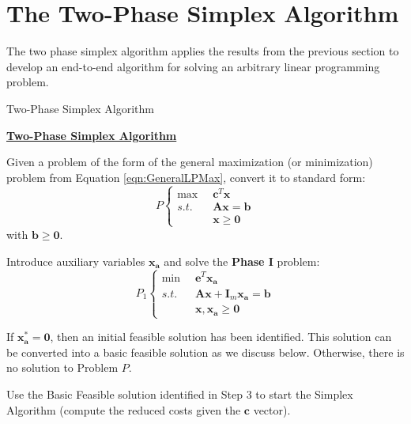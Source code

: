 \section{The Two-Phase Simplex Algorithm}
The two phase simplex algorithm applies the results from the previous section to develop an end-to-end algorithm for solving an arbitrary linear programming problem. 
\begin{algorithm}
\caption{Two-Phase Simplex Algorithm}
\label{alg:TwoPhaseSimplex}
\begin{center}
\begin{minipage}[t]{\textwidth-1em}
\underline{\textbf{Two-Phase Simplex Algorithm}}
\begin{enumerate*}
\item Given a problem of the form of the general maximization (or minimization) problem from Equation \ref{eqn:GeneralLPMax}, convert it to standard form:
\begin{displaymath}
P\left\{
\begin{aligned}
\max\;\; & \mathbf{c}^T\mathbf{x}\\
s.t.\;\; & \mathbf{A}\mathbf{x} = \mathbf{b}\\
& \mathbf{x} \geq \mathbf{0}
\end{aligned}\right.
\end{displaymath}
with $\mathbf{b} \geq \mathbf{0}$. 

\item Introduce auxiliary variables $\mathbf{x_a}$ and solve the \textbf{Phase I} problem:
\begin{displaymath}
P_1\left\{
\begin{aligned}
\min\;\; & \mathbf{e}^T\mathbf{x_a}\\
s.t.\;\; & \mathbf{A}\mathbf{x} + \mathbf{I}_m\mathbf{x_a} = \mathbf{b}\\
& \mathbf{x},\mathbf{x_a} \geq \mathbf{0}
\end{aligned}\right.
\end{displaymath}

\item If $\mathbf{x}_\mathbf{a}^* = \mathbf{0}$, then an initial feasible solution has been identified. This solution can be converted into a basic feasible solution as we discuss below. Otherwise, there is no solution to Problem $P$.

\item Use the Basic Feasible solution identified in Step 3 to start the Simplex Algorithm (compute the reduced costs given the $\mathbf{c}$ vector). 


\end{enumerate*}
\end{minipage}
\end{center}
\end{algorithm}
